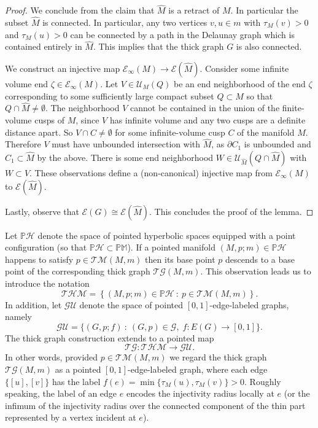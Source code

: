 \documentclass{amsart}
\newcommand{\MP}{\mathbb{PM}}
\newcommand{\Points}{\mathbb{P}}
\newcommand{\Graphs}{\mathcal{G}}
\newcommand{\GraphsU}{\mathcal{GU}}
\newcommand{\Hypers}{\mathcal{H}}
\newcommand{\HypersP}{\Points\Hypers}
\newcommand{\ThickGraph}{\mathcal{TG}}
\newcommand{\ThickHypersP}{\mathcal{THM}}
\newcommand{\ThickManifold}[2]{\mathcal{TM}(#1,#2)}
\newcommand{\Ends}[1]{\mathcal{E}\left(#1\right)}
\newcommand{\EndsInf}[1]{\mathcal{E}_{\infty}\left(#1\right)}
\theoremstyle{plain}
\numberwithin{equation}{section}
\theoremstyle{definition}
\begin{document}
\begin{proof}
We conclude from the claim that  $\widehat M$ is a retract of $M$. 
In particular the subset $\widehat M$ is connected. 
In particular, any two vertices $v,u\in m$ with $\tau_M(v)>0$ and $\tau_M(u)>0$ can be connected by a path in the Delaunay graph which is contained entirely in $\widehat M$. This implies that the thick graph $G$ is also connected. 

We construct an injective map  $\EndsInf{M} \to \Ends{\widehat{M}}$. 
Consider some infinite volume end $\zeta \in \EndsInf{M}$. Let  $V \in \mathcal{U}_M(Q)$ be an end neighborhood of the end $\zeta $  corresponding to some sufficiently large compact subset $Q \subset M$ so that $Q \cap \widehat M \neq \emptyset$. The neighborhood $V$ cannot be contained in the union of the finite-volume cusps of $M$, since $V$ has infinite volume and any two cusps are a definite distance apart.
So  $V \cap C \neq \emptyset$ for some infinite-volume cusp $C$ of the manifold $M$. Therefore $V$ must have unbounded intersection with $\widehat M$, as $\partial C_1$ is unbounded and $C_1 \subset \widehat M$ by the above. 
There is some end neighborhood $W \in \mathcal{U}_{\widehat M}(Q \cap \widehat M)$ with $W \subset V$. These observations define a (non-canonical) injective map from $\EndsInf{M}$ to $\Ends{\widehat{M}}$.

Lastly, observe that $\Ends{G} \cong \Ends{\widehat M}$. This concludes the proof of the lemma.
\end{proof}

Let $\HypersP$ denote the space   of pointed hyperbolic spaces equipped with a point configuration (so that $\HypersP \subset \MP$). If a pointed manifold $(M,p;m) \in \HypersP$ happens to satisfy $p \in \ThickManifold{M}{m}$ then its base point $p$ descends to a base point of the corresponding thick graph $\ThickGraph(M,m)$.
This observation leads us to introduce the notation
$$ \ThickHypersP = \left\{(M,p;m) \in \HypersP \: : \: p \in \ThickManifold{M}{m} \right\}.$$
In addition, let $\GraphsU$ denote the space of pointed $\left[0,1\right]$-edge-labeled graphs, namely
$$\GraphsU = \{ (G,p;f) \: : \: (G,p) \in \Graphs, \; f : E(G) \to \left[0,1\right] \}.$$
The thick graph construction extends to a pointed map
$$ \ThickGraph : \ThickHypersP \to \GraphsU.$$
In other words, provided $p \in \ThickManifold{M}{m}$ we regard the thick graph $\ThickGraph(M,m)$ as a pointed $\left[0,1\right]$-edge-labeled graph, where each edge $\{\left[u\right],\left[v\right]\}$ has the label $f(e)=\min \{\tau_M(u),\tau_M(v)\} > 0$.  Roughly speaking, the label of an edge $e$ encodes the injectivity radius locally at $e$ (or the infimum of the injectivity radius over the connected component of the thin part represented by a vertex incident at $e$).
\end{document}
